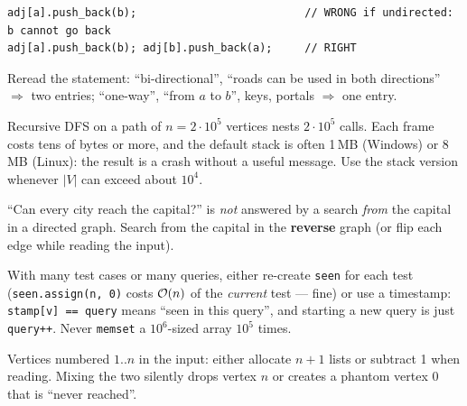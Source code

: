 \begin{warningbox}
\begin{lstlisting}[style=snippet]
adj[a].push_back(b);                          // WRONG if undirected: b cannot go back
adj[a].push_back(b); adj[b].push_back(a);     // RIGHT
\end{lstlisting}
Reread the statement: ``bi-directional'', ``roads can be used in both directions'' $\Rightarrow$ two entries; ``one-way'', ``from $a$ to $b$'', keys, portals $\Rightarrow$ one entry.
\end{warningbox}

\begin{warningbox}
Recursive DFS on a path of $n = 2\cdot10^5$ vertices nests $2\cdot 10^5$ calls. Each frame costs tens of bytes or more, and the default stack is often 1\,MB (Windows) or 8\,MB (Linux): the result is a crash without a useful message. Use the stack version whenever $|V|$ can exceed about $10^4$.
\end{warningbox}

\begin{warningbox}
``Can every city reach the capital?'' is \emph{not} answered by a search \emph{from} the capital in a directed graph. Search from the capital in the \textbf{reverse} graph (or flip each edge while reading the input).
\end{warningbox}

\begin{warningbox}
With many test cases or many queries, either re-create \texttt{seen} for each test (\texttt{seen.assign(n, 0)} costs $\mathcal{O}(n)$ of the \emph{current} test --- fine) or use a timestamp: \texttt{stamp[v] == query} means ``seen in this query'', and starting a new query is just \texttt{query++}. Never \texttt{memset} a $10^6$-sized array $10^5$ times.
\end{warningbox}

\begin{warningbox}
Vertices numbered $1..n$ in the input: either allocate $n+1$ lists or subtract 1 when reading. Mixing the two silently drops vertex $n$ or creates a phantom vertex $0$ that is ``never reached''.
\end{warningbox}

